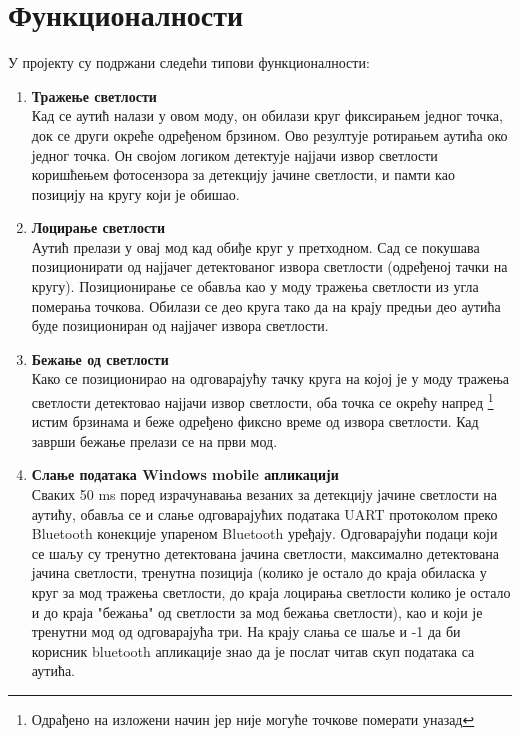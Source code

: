 \section{Функционалности} \label{sec:fun}
У пројекту су подржани следећи типови функционалности:
\begin{enumerate}[1.]
\item \textbf{Тражење светлости} 
\\ Кад се аутић налази у овом моду, он обилази круг фиксирањем једног точка, док се други окреће одређеном брзином. Ово резултује ротирањем аутића око једног точка. Он својом логиком детектује најјачи извор светлости коришћењем фотосензора за детекцију јачине светлости, и памти као позицију на кругу који је обишао.
\item \textbf{Лоцирање светлости}
\\ Аутић прелази у овај мод кад обиђе круг у претходном. Сад се покушава позиционирати од најјачег детектованог извора светлости (одређеној тачки на кругу). Позиционирање се обавља као у моду тражења светлости из угла померања точкова.  Обилази се део круга тако да на крају предњи део аутића буде позициониран од најјачег извора светлости.
\item \textbf{Бежање од светлости}
\\ Како се позиционирао на одговарајућу тачку круга на којој је у моду тражења светлости детектовао најјачи извор светлости, оба точка се окрећу напред \footnote{Одрађено на изложени начин јер није могуће точкове померати уназад} истим брзинама и беже одређено фиксно време од извора светлости. Кад заврши бежање прелази се на први мод.
\item \textbf{Слање података Windows mobile апликацији}
\\ Сваких 50 ms поред израчунавања везаних за детекцију јачине светлости на аутићу, обавља се и слање одговарајућих података UART протоколом  преко Bluetooth конекције упареном Bluetooth уређају. Одговарајући подаци који се шаљу су тренутно детектована јачина светлости, максимално детектована јачина светлости, тренутна позиција (колико је остало до краја обиласка у круг за мод тражења светлости, до краја лоцирања светлости колико је остало и до краја "бежања" од светлости за мод бежања светлости), као и који је тренутни мод од одговарајућа три. На крају слања се шаље и -1 да би корисник bluetooth апликације знао да је послат читав скуп података са аутића.  

\end{enumerate}